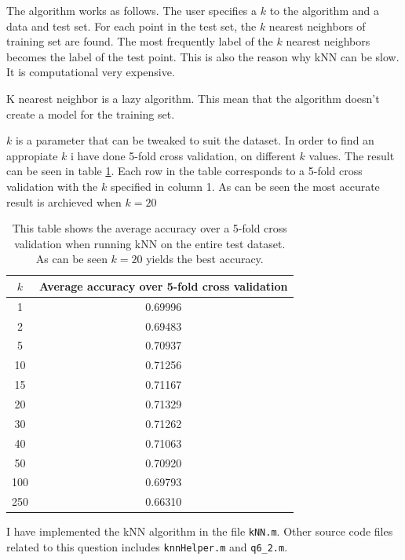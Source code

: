 \documentclass[10pt]{article}
\begin{document}
The algorithm works as follows. The user specifies a $k$ to the algorithm and a data and test set. For each point in the test set, the $k$ nearest neighbors of training set are found. The most frequently label of the $k$ nearest neighbors becomes the label of the test point. This is also the reason why kNN can be slow. It is computational very expensive.

K nearest neighbor is a lazy algorithm. This mean that the algorithm doesn't create a model for the training set. 

$k$ is a parameter that can be tweaked to suit the dataset. In order to find an appropiate $k$ i have done 5-fold cross validation, on different $k$ values. The result can be seen in table \ref{table2}. Each row in the table corresponds to a 5-fold cross validation with the $k$ specified in column 1. As can be seen the most accurate result is archieved when $k=20$

\begin{table}
  \begin{center}  
    \begin{tabular}{ | c | c |}
      \hline
      $k$ & Average accuracy over 5-fold cross validation\\
      \hline
        1    &     0.69996\\
        2    &     0.69483\\
        5    &     0.70937\\
       10    &     0.71256\\
       15    &     0.71167\\
       20    &     0.71329\\
       30    &     0.71262\\
       40    &     0.71063\\
       50    &     0.70920\\
      100    &     0.69793\\
      250    &     0.66310\\        
      \hline
    \end{tabular}
    \caption{This table shows the average accuracy over a 5-fold cross validation when running kNN on the entire test dataset. As can be seen $k=20$ yields the best accuracy.}
    \label{table2}
  \end{center}    
\end{table}   

I have implemented the kNN algorithm in the file \texttt{kNN.m}. Other source code files related to this question includes \texttt{knnHelper.m} and \texttt{q6_2.m}.
\end{document}

